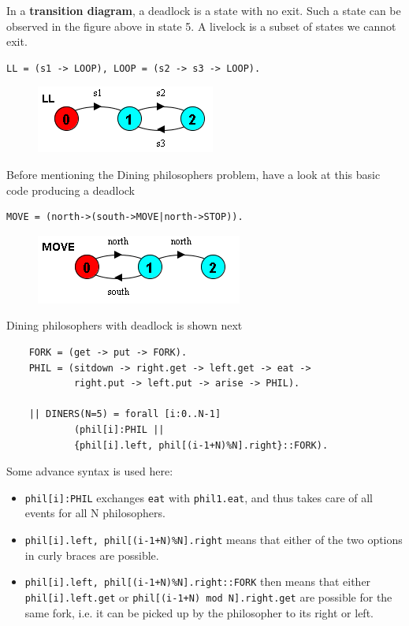 In a \textbf{transition diagram}, a deadlock is a state with no exit. Such a state can be observed in the figure above in state 5. A livelock is a subset of states we cannot exit. 
\begin{verbatim}
LL = (s1 -> LOOP), LOOP = (s2 -> s3 -> LOOP).
\end{verbatim}
\begin{figure}[H]
\centering
\includegraphics[width=0.5\linewidth]{figures/Modeling concurrent programs/LiveLock/LiveLock.PNG}
\end{figure}
Before mentioning the Dining philosophers problem, have a look at this basic code producing a deadlock
\begin{verbatim}
MOVE = (north->(south->MOVE|north->STOP)).
\end{verbatim}
\begin{figure}[H]
\centering
\includegraphics[width=0.5\linewidth]{figures/Modeling concurrent programs/Deadlock/Deadlock.PNG}
\end{figure}
Dining philosophers with deadlock is shown next
\begin{verbatim}
    FORK = (get -> put -> FORK).
    PHIL = (sitdown -> right.get -> left.get -> eat ->
            right.put -> left.put -> arise -> PHIL).
    
    || DINERS(N=5) = forall [i:0..N-1]
            (phil[i]:PHIL ||
            {phil[i].left, phil[(i-1+N)%N].right}::FORK).
\end{verbatim}
Some advance syntax is used here:
\begin{itemize}
    \item \texttt{phil[i]:PHIL} exchanges \texttt{eat} with \texttt{phil1.eat}, and thus takes care of all events for all N philosophers.
    \item \texttt{{phil[i].left, phil[(i-1+N)\%N].right}} means that either of the two options in curly braces are possible.
    \item \texttt{{phil[i].left, phil[(i-1+N)\%N].right}::FORK} then means that either \texttt{phil[i].left.get} or \texttt{phil[(i-1+N) mod N].right.get} are possible for the same fork, i.e. it can be picked up by the philosopher to its right or left.
\end{itemize}
